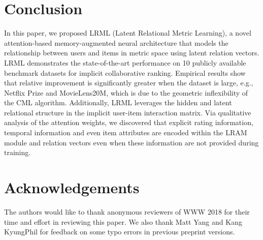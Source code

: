 \documentclass[sigconf]{acmart}
\begin{document}
\section{Conclusion}
In this paper, we proposed \textsc{LRML} (Latent Relational Metric Learning), a novel attention-based memory-augmented neural architecture that models
the relationship between users and items in metric space using latent relation vectors. \textsc{LRML} demonstrates the state-of-the-art performance on 10 publicly available benchmark datasets for implicit collaborative ranking. Empirical results show that relative improvement is significantly greater when the dataset is large, e.g., Netflix Prize and MovieLens20M, which is due to the geometric inflexibility of the CML algorithm. Additionally, \textsc{LRML} leverages the hidden and latent relational structure in the implicit user-item interaction matrix. Via qualitative analysis of the attention weights, we discovered that explicit rating information, temporal information and even item attributes are encoded within the LRAM module and relation vectors even when these information are not provided during training. 

\section{Acknowledgements}
The authors would like to thank anonymous reviewers of WWW 2018 for their time and effort in reviewing this paper. We also thank Matt Yang and Kang KyungPhil for feedback on some typo errors in previous preprint versions. 





\end{document}
